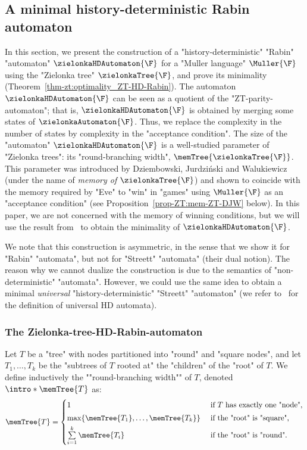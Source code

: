 \documentclass{theoretics}
\begin{document}
\subsection{A minimal history-deterministic Rabin automaton}\label{subsec-zt: GFG-Rabin}
In this section, we present the construction of a "history-deterministic" "Rabin" "automaton" $\zielonkaHDAutomaton{\F}$ for a "Muller language" $\Muller{\F}$ using the "Zielonka tree" $\zielonkaTree{\F}$, and prove its minimality (Theorem~\ref{thm-zt:optimality_ZT-HD-Rabin}).
The automaton $\zielonkaHDAutomaton{\F}$ can be seen as a quotient of the "ZT-parity-automaton"; that is, $\zielonkaHDAutomaton{\F}$ is obtained by merging some states of $\zielonkaAutomaton{\F}$. Thus, we replace the complexity in the number of states by complexity in the "acceptance condition".
The size of the "automaton" $\zielonkaHDAutomaton{\F}$ is a well-studied parameter of "Zielonka trees": its "round-branching width", $\memTree{\zielonkaTree{\F}}$. This parameter was introduced by Dziembowski, Jurdziński and Walukiewicz~\cite{DJW1997memory} (under the name of \emph{memory of $\zielonkaTree{\F}$}) and shown to coincide with the memory required by "Eve" to "win" in "games" using $\Muller{\F}$ as an "acceptance condition" (see Proposition~\ref{prop-ZT:mem-ZT-DJW} below). In this paper, we are not concerned with the memory of winning conditions, but we will use the result from~\cite{DJW1997memory} to obtain the minimality of $\zielonkaHDAutomaton{\F}$.


We note that this construction is asymmetric, in the sense that we show it for "Rabin" "automata", but not for "Streett" "automata" (their dual notion). The reason why we cannot dualize the construction is due to the semantics of "non-deterministic" "automata". However, we could use the same idea to obtain a minimal \emph{universal} "history-deterministic" "Streett" "automaton" (we refer to~\cite{BL19GFGFromND} for the definition of universal HD automata).
	
	
\subsubsection{The Zielonka-tree-HD-Rabin-automaton}\label{subsubsec-zt-GFG: definition}
\begin{definition}
	Let $T$ be a "tree" with nodes partitioned into "round" and "square nodes", and let $T_1, \dots, T_k$ be the "subtrees of $T$ rooted at" the "children" of the "root" of $T$. 
	\AP We define inductively the ""round-branching width"" of $T$, denoted $\intro*\memTree{T}$ as:
	\begin{equation*}
		\memTree{T} =	\begin{cases}
			1 & \text{ if } T \text{ has exactly one "node",}\\[1mm]
			\max \{ \memTree{T_1}, \dots , \memTree{T_k}\} & \text{ if the "root" is "square",}\\[1mm]
			\sum\limits_{i=1}^k \memTree{T_i} & \text{ if the "root" is "round".}
		\end{cases}
	\end{equation*}
\end{definition}
\end{document}
